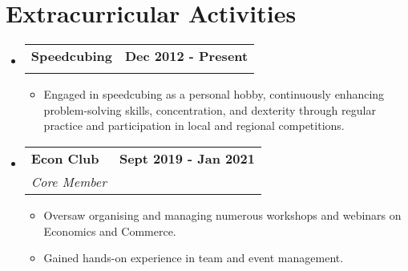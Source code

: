 \documentclass[letterpaper,11pt]{article}
\makeatletter
\newcommand{\resumeItem}[1]{
  \item\small{
    {#1 \vspace{-2pt}}
  }
}
\newcommand{\resumeSubheading}[4]{
  \vspace{-2pt}\item
    \begin{tabular*}{1.0\textwidth}[t]{l@{\extracolsep{\fill}}r}
      \textbf{#1} & \textbf{\small #2} \\
      \textit{\small#3} & \textit{\small #4} \\
    \end{tabular*}\vspace{-7pt}
}
\newcommand{\resumeSubHeadingListStart}{\begin{itemize}[leftmargin=0.0in, label={}]}
\newcommand{\resumeSubHeadingListEnd}{\end{itemize}}
\newcommand{\resumeItemListStart}{\begin{itemize}}
\newcommand{\resumeItemListEnd}{\end{itemize}\vspace{-5pt}}
\makeatother
\begin{document}
%




                  
      
     
         


\section{Extracurricular Activities}

\resumeSubHeadingListStart
    \resumeSubheading
      {Speedcubing }{Dec 2012 - Present}{}{}
\vspace{-19pt}

      \resumeItemListStart
                \resumeItem{Engaged in speedcubing as a personal hobby, continuously enhancing problem-solving skills, concentration, and dexterity through regular practice and participation in local and regional competitions.}

            \resumeItemListEnd
        
    \resumeSubHeadingListEnd
    \vspace{-5pt}
\resumeSubHeadingListStart
\resumeSubheading
      {Econ Club }{ Sept 2019 - Jan 2021}
    {Core Member}{}
\vspace{-7pt}
      \resumeItemListStart
                \resumeItem{Oversaw organising and managing numerous workshops and webinars on Economics and Commerce.}
                \resumeItem{Gained hands-on experience in team and event management.}
            \resumeItemListEnd
        
    \resumeSubHeadingListEnd

 
\end{document}
